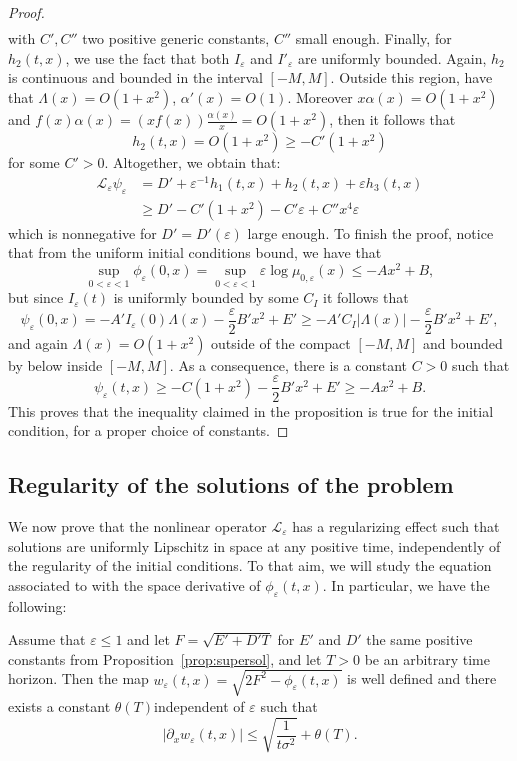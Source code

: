 \documentclass[onefignum,onetabnum]{siamart190516}
\newcommand{\1}{\mathbbm{1}}
\newcommand{\eps}{\varepsilon}
\begin{document}
\begin{proof}
\begin{align*}
\end{align*}
with $C',C''$ two positive generic constants, $C''$ small enough. Finally, for $h_2(t,x)$, we use the fact that both $I_\eps$ and $I'_\eps$ are uniformly bounded. Again, $h_2$ is continuous and bounded in the interval $[-M,M]$. Outside this region, have that $\Lambda(x)=O(1+x^2)$, $\alpha'(x)=O(1)$. Moreover $x\alpha(x)=O(1+x^2)$ and $f(x)\alpha(x)=(xf(x))\frac{\alpha(x)}{x}=O(1+x^2)$, then it follows that
$$
h_2(t,x)=O(1+x^2)\geq -C'(1+x^2)
$$
for some $C'>0$.
Altogether, we obtain that:
\begin{align*}
\mathcal L_\eps\psi_\eps &= D'+\eps^{-1}h_1(t,x)+h_2(t,x)+\eps h_3(t,x)
\\
&\geq D'-C'(1+x^2)-C'\eps+C''x^4\eps
\end{align*}
which is nonnegative for $D'=D'(\eps)$ large enough. To finish the proof, notice that from the uniform initial conditions bound, we have that
$$
\sup_{0<\eps<1}\phi_\eps(0,x)=\sup_{0<\eps<1}\eps\log \mu_{0,\eps}(x) \leq -Ax^2+B,
$$
but since $I_\eps(t)$ is uniformly bounded by some $C_I$ it follows that 
$$
\psi_\eps(0,x)= -A'I_\eps(0)\Lambda(x)-\frac{\eps}2 B'x^2+E' \geq -A'C_I|\Lambda(x)|-\frac{\eps}2 B'x^2+E',
$$
and again $\Lambda(x)=O(1+x^2)$ outside of the compact $[-M,M]$ and bounded by below inside $[-M,M]$. As a consequence, there is a constant $C>0$ such that
$$
\psi_\eps(t,x)\geq -C(1+x^2)-\frac{\eps}2 B'x^2+E'\geq -Ax^2+B.
$$
This proves that the inequality claimed in the proposition is true for the initial condition, for a proper choice of constants.
\end{proof}


\subsection{Regularity of the solutions of the problem}

We now prove that the nonlinear operator $\mathcal L_\eps$ has a regularizing effect such that solutions are uniformly Lipschitz in space at any positive time, independently of the regularity of the initial conditions. To that aim, we will study the equation associated to with the space derivative of $\phi_\eps(t,x)$. In particular, we have the following:
\begin{proposition}
\label{prop:regularity_space}
Assume that $\eps\leq 1$ and let $F=\sqrt{E'+D'T}$ for $E'$ and $D'$ the same positive constants from Proposition~\ref{prop:supersol}, and let $T>0$ be an arbitrary time horizon. Then the map $w_\eps(t,x)=\sqrt{2F^2-\phi_\eps(t,x)}$ is well defined and there exists a constant $\theta(T)$independent of $\eps$ such that
$$
\left|\partial_x w_\eps(t,x)\right|\leq  \sqrt{\frac{1}{t\sigma^2}}+\theta(T).
$$
\end{proposition}
\end{document}
